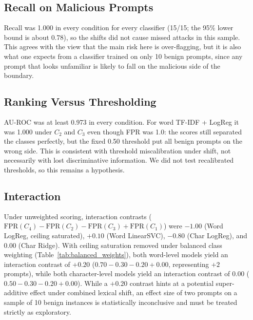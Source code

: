 \documentclass[conference]{IEEEtran}
\begin{document}
\subsection{Recall on Malicious Prompts}
Recall was 1.000 in every condition for every classifier (15/15; the 95\% lower bound is about 0.78), so the shifts did not cause missed attacks in this sample. This agrees with the view that the main risk here is over-flagging, but it is also what one expects from a classifier trained on only 10 benign prompts, since any prompt that looks unfamiliar is likely to fall on the malicious side of the boundary.

\subsection{Ranking Versus Thresholding}
AU-ROC was at least 0.973 in every condition. For word TF-IDF + LogReg it was 1.000 under $C_2$ and $C_3$ even though FPR was 1.0: the scores still separated the classes perfectly, but the fixed 0.50 threshold put all benign prompts on the wrong side. This is consistent with threshold miscalibration under shift, not necessarily with lost discriminative information. We did not test recalibrated thresholds, so this remains a hypothesis.

\subsection{Interaction}
Under unweighted scoring, interaction contrasts ($\text{FPR}(C_4) - \text{FPR}(C_2) - \text{FPR}(C_3) + \text{FPR}(C_1)$) were $-1.00$ (Word LogReg, ceiling saturated), $+0.10$ (Word LinearSVC), $-0.80$ (Char LogReg), and $0.00$ (Char Ridge). With ceiling saturation removed under balanced class weighting (Table~\ref{tab:balanced_weights}), both word-level models yield an interaction contrast of $+0.20$ ($0.70 - 0.30 - 0.20 + 0.00$, representing $+2$ prompts), while both character-level models yield an interaction contrast of $0.00$ ($0.50 - 0.30 - 0.20 + 0.00$). While a $+0.20$ contrast hints at a potential super-additive effect under combined lexical shift, an effect size of two prompts on a sample of 10 benign instances is statistically inconclusive and must be treated strictly as exploratory.
\end{document}
